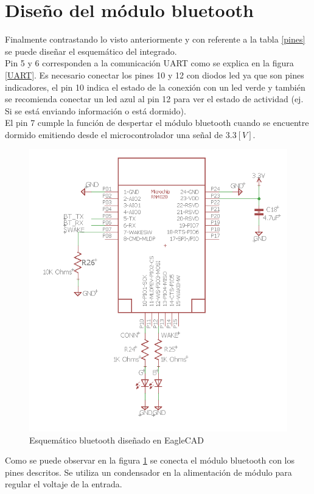 \section{Diseño del módulo bluetooth}
Finalmente contrastando lo visto anteriormente y con referente a la tabla \ref{pines} se puede diseñar el esquemático del integrado.\\
Pin 5 y 6 corresponden a la comunicación UART como se explica en la figura \ref{UART}. Es necesario conectar los pines 10 y 12 con diodos led ya que son pines indicadores, el pin 10 indica el estado de la conexión con un led verde y también se recomienda conectar un led azul al pin 12 para ver el estado de actividad (ej. Si se está enviando información o está dormido).\\
El pin 7 cumple la función de despertar el módulo bluetooth cuando se encuentre dormido emitiendo desde el microcontrolador una señal de $3.3[V]$.\\
\begin{figure}[H]
\centering
\includegraphics[scale=0.8]{figuras/bluetooth/eagle.png}
\caption{Esquemático bluetooth diseñado en EagleCAD}
\label{eagle}
\end{figure}

Como se puede observar en la figura \ref{eagle} se conecta el módulo bluetooth con los pines descritos. Se utiliza un condensador en la alimentación de módulo para regular el voltaje de la entrada.




